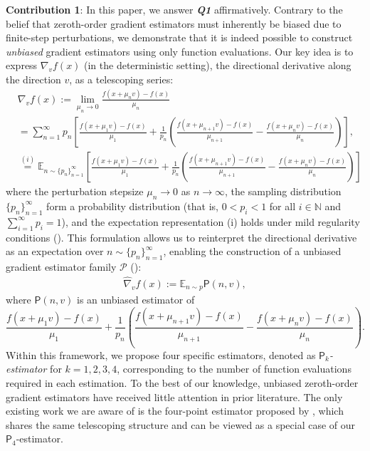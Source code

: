 \documentclass{article}
\newcommand{\EE}{\mathbb{E}}
\newcommand{\NN}{\mathbb{N}}
\theoremstyle{definition}
\theoremstyle{plain}
\theoremstyle{remark}
\newcommand{\sfP}{\mathsf{P}}
\begin{document}
\textbf{Contribution 1}: In this paper, we answer \textit{\textbf{Q1}} affirmatively. Contrary to the belief that zeroth-order gradient estimators must inherently be biased due to finite-step perturbations, we demonstrate that it is indeed possible to construct \textit{unbiased} gradient estimators using only function evaluations. Our key idea is to express $\nabla_v f(x)$ (in the deterministic setting), the directional derivative along the direction $v$, as a telescoping series:
\begin{align}\label{eq:telescoping}
    &\nabla_vf(x):= \lim_{\mu_n \to 0} \frac{f(x+\mu_n v) - f(x)}{\mu_n} \nonumber\\
    &=\sum_{n=1}^\infty p_n\left[\frac{f(x+\mu_1 v) - f(x)}{\mu_1} + \frac{1}{p_n}\left( \frac{f(x+\mu_{n+1} v) - f(x)}{\mu_{n+1}} - \frac{f(x+\mu_n v) - f(x)}{\mu_n}\right) \right], \\
    &\overset{(i)}{=} \EE_{n\sim \{p_n\}_{n=1}^\infty} \left[\frac{f(x+\mu_1 v) - f(x)}{\mu_1} + \frac{1}{p_n}\left( \frac{f(x+\mu_{n+1} v) - f(x)}{\mu_{n+1}} - \frac{f(x+\mu_n v) - f(x)}{\mu_n}\right) \right]\nonumber
\end{align} 
where the perturbation stepsize $\mu_n \to 0$ as $n \to \infty$, the sampling distribution $\{p_n\}_{n=1}^\infty$ form a probability distribution (that is, $0<p_i<1$ for all $i\in \NN$ and $\sum_{i=1}^\infty p_i = 1$), and the expectation representation (i) holds under mild regularity conditions ().   This formulation allows us to reinterpret the directional derivative as an expectation over $n \sim \{p_n\}_{n=1}^\infty$, enabling the construction of a unbiased gradient estimator family $\mathscr{P}$ (): 
\begin{align*}
    \hat{\nabla}_v f(x):= \EE_{n\sim p} \sfP(n,v), 
\end{align*} 
where $\sfP(n,v)$ is an unbiased estimator of $$\frac{f(x+\mu_1 v) - f(x)}{\mu_1} + \frac{1}{p_n}\left( \frac{f(x+\mu_{n+1} v) - f(x)}{\mu_{n+1}} - \frac{f(x+\mu_n v) - f(x)}{\mu_n}\right).$$ 
Within this framework, we propose four specific estimators, denoted as \textit{$\sfP_k$-estimator} for $k = 1, 2, 3, 4$, corresponding to the number of function evaluations required in each estimation. To the best of our knowledge, unbiased zeroth-order gradient estimators have received little attention in prior literature.  The only existing work we are aware of is the four-point estimator proposed by \citet{chen2020unbiased}, which shares the same telescoping structure and can be viewed as a special case of our $\sfP_4$-estimator.  
\end{document}

